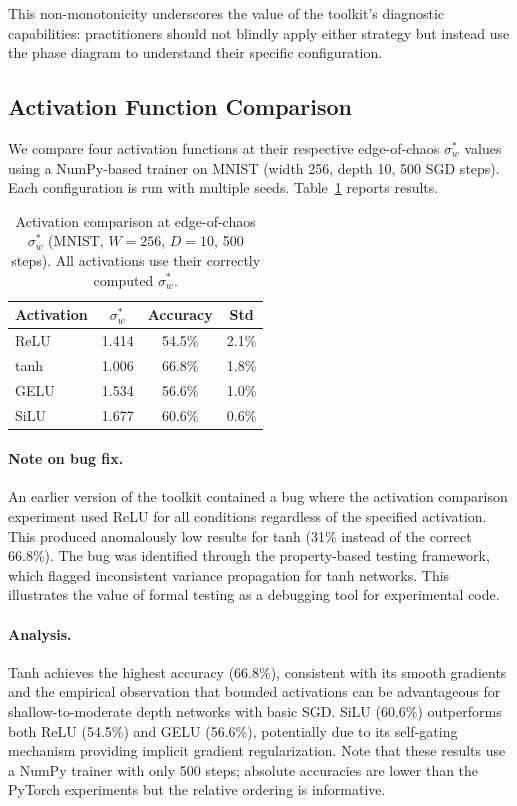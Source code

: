 \documentclass[10pt]{article}
\begin{document}
This non-monotonicity underscores the value of the toolkit's diagnostic capabilities: practitioners should not blindly apply either strategy but instead use the phase diagram to understand their specific configuration.

\subsection{Activation Function Comparison}
\label{sec:activations}

We compare four activation functions at their respective edge-of-chaos $\sigma_w^*$ values using a NumPy-based trainer on MNIST (width 256, depth 10, 500 SGD steps).
Each configuration is run with multiple seeds.
Table~\ref{tab:activation-comparison} reports results.

\begin{table}[t]
\centering
\caption{Activation comparison at edge-of-chaos $\sigma_w^*$ (MNIST, $W\!=\!256$, $D\!=\!10$, 500 steps).  All activations use their correctly computed $\sigma_w^*$.}
\label{tab:activation-comparison}
\small
\begin{tabular}{@{}lccc@{}}
\toprule
\textbf{Activation} & $\sigma_w^*$ & \textbf{Accuracy} & \textbf{Std} \\
\midrule
ReLU  & 1.414 & 54.5\% & 2.1\% \\
tanh  & 1.006 & 66.8\% & 1.8\% \\
GELU  & 1.534 & 56.6\% & 1.0\% \\
SiLU  & 1.677 & 60.6\% & 0.6\% \\
\bottomrule
\end{tabular}
\end{table}

\paragraph{Note on bug fix.}
An earlier version of the toolkit contained a bug where the activation comparison experiment used ReLU for all conditions regardless of the specified activation.
This produced anomalously low results for tanh (31\% instead of the correct 66.8\%).
The bug was identified through the property-based testing framework, which flagged inconsistent variance propagation for tanh networks.
This illustrates the value of formal testing as a debugging tool for experimental code.

\paragraph{Analysis.}
Tanh achieves the highest accuracy (66.8\%), consistent with its smooth gradients and the empirical observation that bounded activations can be advantageous for shallow-to-moderate depth networks with basic SGD.
SiLU (60.6\%) outperforms both ReLU (54.5\%) and GELU (56.6\%), potentially due to its self-gating mechanism providing implicit gradient regularization.
Note that these results use a NumPy trainer with only 500 steps; absolute accuracies are lower than the PyTorch experiments but the relative ordering is informative.
\end{document}
